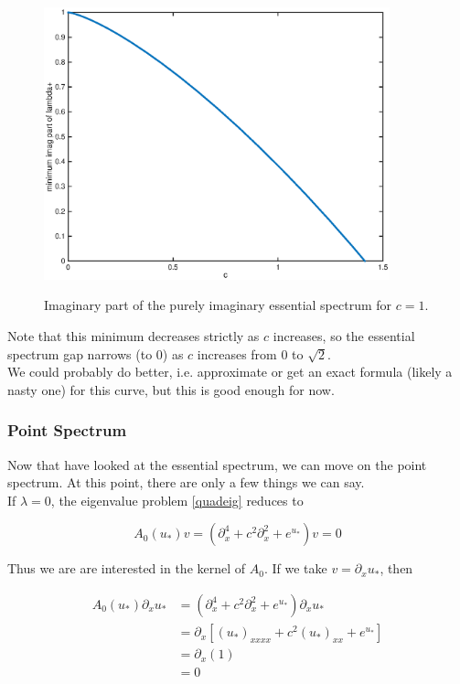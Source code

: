 \documentclass[12pt]{article}
\begin{document}
\begin{figure}[H]
\centering
\includegraphics[width=10cm]{minlambdaplus.eps}
\label{fig:essspec1}
\caption{Imaginary part of the purely imaginary essential spectrum for $c = 1$.}
\end{figure}

Note that this minimum decreases strictly as $c$ increases, so the essential spectrum gap narrows (to 0) as $c$ increases from 0 to $\sqrt{2}$.\\

We could probably do better, i.e. approximate or get an exact formula (likely a nasty one) for this curve, but this is good enough for now.

\subsubsection{Point Spectrum}

Now that have looked at the essential spectrum, we can move on the point spectrum. At this point, there are only a few things we can say.\\

If $\lambda = 0$, the eigenvalue problem \eqref{quadeig} reduces to

\begin{equation*}
A_0(u_*) v = (\partial_x^4 + c^2 \partial_x^2 + e^{u_*})v = 0
\end{equation*}

Thus we are are interested in the kernel of $A_0$. If we take $v = \partial_x u_*$, then

\begin{align*}
A_0(u_*) \partial_x u_* &= 
(\partial_x^4 + c^2 \partial_x^2 + e^{u_*})\partial_x u_* \\
&= \partial_x[(u_*)_{xxxx} + c^2 (u_*)_{xx} + e^{u_*}] \\
&= \partial_x(1) \\
&= 0
\end{align*}
\end{document}
